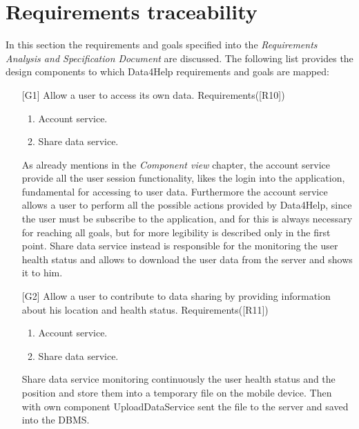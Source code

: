 \section{Requirements traceability}
In this section the requirements and goals specified into the \textit{Requirements Analysis and Specification Document} are discussed. The following list provides the design components to which Data4Help requirements and goals are mapped: 
\begin{itemize}
\item[{[G1]}] Allow a user to access its own data. Requirements([R10])
	\begin{enumerate}
	\item Account service.
	\item Share data service.
	\end{enumerate}
As already mentions in the \textit{Component view} chapter, the account service provide all the user session functionality, likes the login into the application, fundamental for accessing to user data. Furthermore the account service allows a user to perform all the possible actions provided by Data4Help, since the user must be subscribe to the application, and for this is always necessary for reaching all goals, but for more legibility is described only in the first point. Share data service instead is responsible for the monitoring the user health status and allows to download the user data from the server and shows it to him.

\item[{[G2]}] Allow a user to contribute to data sharing by providing information about his location and health status. Requirements([R11])
	\begin{enumerate}
	\item Account service.
	\item Share data service.
	\end{enumerate}
Share data service monitoring continuously the user health status and the position and store them into a temporary file on the mobile device. Then with own component UploadDataService sent the file to the server and saved into the DBMS.


\end{itemize}
